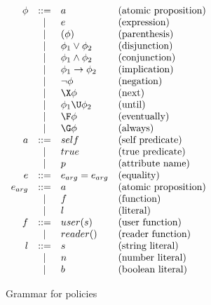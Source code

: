 \begin{table}[h!]
    \centering
    $
    \begin{array}{rcll}
      \phi        & ::=   & a                     & \text{(atomic proposition)} \\
                  & |     & e                     & \text{(expression)} \\
                  & |     & \left( \phi \right)   & \text{(parenthesis)} \\
                  & |     & \phi_1 \lor \phi_2    & \text{(disjunction)} \\
                  & |     & \phi_1 \land \phi_2   & \text{(conjunction)} \\
                  & |     & \phi_1 \to \phi_2     & \text{(implication)} \\
                  & |     & \neg \phi             & \text{(negation)} \\
                  & |     & \X \phi               & \text{(next)} \\
                  & |     & \phi_1 \U \phi_2      & \text{(until)} \\
                  & |     & \F \phi               & \text{(eventually)} \\
                  & |     & \G \phi               & \text{(always)} \\
      a           & ::=   & self                  & \text{(self predicate)} \\
                  & |     & true                  & \text{(true predicate)} \\
                  & |     & p                     & \text{(attribute name)} \\
      e           & ::=   & e_{arg} = e_{arg}     & \text{(equality)} \\
      e_{arg}     & ::=   & a                     & \text{(atomic proposition)} \\
                  & |     & f                     & \text{(function)} \\
                  & |     & l                     & \text{(literal)} \\
      f           & ::=   & user(s)               & \text{(user function)} \\
                  & |     & reader()              & \text{(reader function)} \\
      l           & ::=   & s                     & \text{(string literal)} \\
                  & |     & n                     & \text{(number literal)} \\
                  & |     & b                     & \text{(boolean literal)}
    \end{array}
    $
    \caption{Grammar for policies}
    \label{tab:grammar}
\end{table}